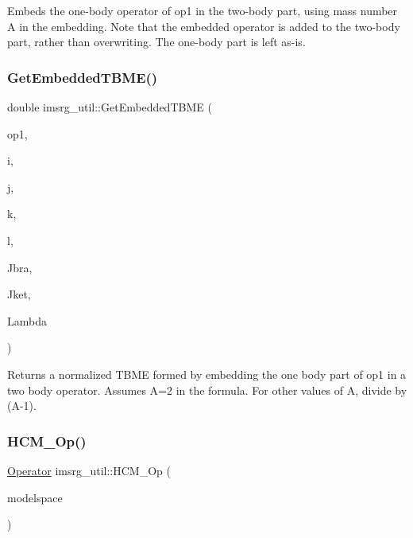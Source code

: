 Embeds the one-\/body operator of op1 in the two-\/body part, using mass number A in the embedding. Note that the embedded operator is added to the two-\/body part, rather than overwriting. The one-\/body part is left as-\/is. \mbox{\label{namespaceimsrg__util_ae46641451de4f2c5fb321e8b0a9713f8}} 
\subsubsection{\texorpdfstring{Get\+Embedded\+T\+B\+M\+E()}{GetEmbeddedTBME()}}
{\footnotesize\ttfamily double imsrg\+\_\+util\+::\+Get\+Embedded\+T\+B\+ME (\begin{DoxyParamCaption}\item[{\hyperlink{classOperator}{Operator} \&}]{op1,  }\item[{index\+\_\+t}]{i,  }\item[{index\+\_\+t}]{j,  }\item[{index\+\_\+t}]{k,  }\item[{index\+\_\+t}]{l,  }\item[{int}]{Jbra,  }\item[{int}]{Jket,  }\item[{int}]{Lambda }\end{DoxyParamCaption})}

Returns a normalized T\+B\+ME formed by embedding the one body part of op1 in a two body operator. Assumes A=2 in the formula. For other values of A, divide by (A-\/1). \mbox{\label{namespaceimsrg__util_aeb2fd25d4b70870b0fa01f652d996185}} 
\subsubsection{\texorpdfstring{H\+C\+M\+\_\+\+Op()}{HCM\_Op()}}
{\footnotesize\ttfamily \hyperlink{classOperator}{Operator} imsrg\+\_\+util\+::\+H\+C\+M\+\_\+\+Op (\begin{DoxyParamCaption}\item[{\hyperlink{classModelSpace}{Model\+Space} \&}]{modelspace }\end{DoxyParamCaption})}

